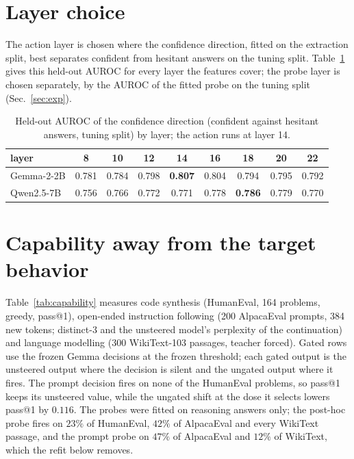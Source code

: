 \section{Layer choice}
\label{app:layers}

The action layer is chosen where the confidence direction, fitted on the
extraction split, best separates confident from hesitant answers on the tuning
split. Table~\ref{tab:layerchoice} gives this held-out AUROC for every layer
the features cover; the probe layer is chosen separately, by the AUROC of the
fitted probe on the tuning split (Sec.~\ref{sec:exp}).

\begin{table}[h]\footnotesize\setlength{\tabcolsep}{5pt}
\centering
\begin{tabular}{l|cccccccc}
\hline
layer & 8 & 10 & 12 & 14 & 16 & 18 & 20 & 22 \\
\hline
Gemma-2-2B & 0.781 & 0.784 & 0.798 & \textbf{0.807} & 0.804 & 0.794 & 0.795 & 0.792 \\
Qwen2.5-7B & 0.756 & 0.766 & 0.772 & 0.771 & 0.778 & \textbf{0.786} & 0.779 & 0.770 \\
\hline
\end{tabular}
\caption{Held-out AUROC of the confidence direction (confident against hesitant
answers, tuning split) by layer; the action runs at layer 14.}
\label{tab:layerchoice}
\end{table}

\section{Capability away from the target behavior}
\label{app:capability}

Table~\ref{tab:capability} measures code synthesis (HumanEval, 164 problems,
greedy, pass@1), open-ended instruction following (200 AlpacaEval prompts, 384
new tokens; distinct-3 and the unsteered model's perplexity of the
continuation) and language modelling (300 WikiText-103 passages, teacher
forced). Gated rows use the frozen Gemma decisions at the frozen threshold;
each gated output is the unsteered output where the decision is silent and the
ungated output where it fires. The prompt decision fires on none of the
HumanEval problems, so pass@1 keeps its unsteered value, while the ungated
shift at the dose it selects lowers pass@1 by $0.116$. The probes were fitted
on reasoning answers only; the post-hoc probe fires on $23\%$ of HumanEval,
$42\%$ of AlpacaEval and every WikiText passage, and the prompt probe on
$47\%$ of AlpacaEval and $12\%$ of WikiText, which the refit below removes.

